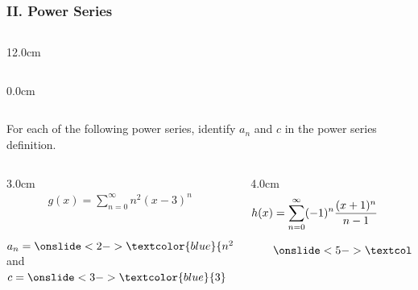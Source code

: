 \begin{frame}
\frametitle{II. Power Series}
\scriptsize
\vspace{0.1cm}
\begin{columns}
\begin{column}{12.0cm}
	\begin{columns}\begin{column}{0.0cm}\end{column}\end{columns}
	
	\vspace{0.5cm}
	
For each of the following power series, identify $a_n$ and $c$ in the power series definition. \\

\vspace{0.1cm}

\begin{columns}
\begin{column}{3.0cm}
	\begin{align*}
		g(x) = \sum \limits_{n=0}^{\infty} n^2 (x-3)^n \\
		\\
		\\
	\end{align*}

	$a_n = \onslide<2->{\textcolor{blue}{n^2}}$ \quad and \quad $c = \onslide<3->{\textcolor{blue}{3}}$

	\vspace{1.2cm}
	
\end{column}
\begin{column}{4.0cm}
	\begin{align*}
	h(x) &= \sum \limits_{n=0}^{\infty} (-1)^n \frac{(x+1)^n}{n-1} \\
	&\onslide<5->{\textcolor{blue}{\,= \sum \limits_{n=0}^{\infty} \frac{(-1)^n}{n-1}\left(x-(-1)\right)^n}}
	\end{align*}


\end{column}
\end{columns}
\end{column}
\end{columns}
\end{frame}
